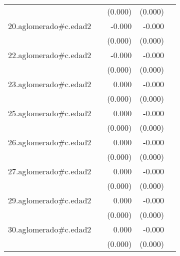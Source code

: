 {\begin{longtable}{l*{4}{D{.}{.}{-1}}}
            &                     &     (0.000)         &     (0.000)         &                     \\
\addlinespace
20.aglomerado#c.edad2&                     &      -0.000         &      -0.000\sym{**} &                     \\
            &                     &     (0.000)         &     (0.000)         &                     \\
\addlinespace
22.aglomerado#c.edad2&                     &      -0.000         &      -0.000\sym{*}  &                     \\
            &                     &     (0.000)         &     (0.000)         &                     \\
\addlinespace
23.aglomerado#c.edad2&                     &       0.000         &      -0.000         &                     \\
            &                     &     (0.000)         &     (0.000)         &                     \\
\addlinespace
25.aglomerado#c.edad2&                     &       0.000         &      -0.000         &                     \\
            &                     &     (0.000)         &     (0.000)         &                     \\
\addlinespace
26.aglomerado#c.edad2&                     &       0.000         &      -0.000         &                     \\
            &                     &     (0.000)         &     (0.000)         &                     \\
\addlinespace
27.aglomerado#c.edad2&                     &       0.000         &      -0.000         &                     \\
            &                     &     (0.000)         &     (0.000)         &                     \\
\addlinespace
29.aglomerado#c.edad2&                     &       0.000         &      -0.000         &                     \\
            &                     &     (0.000)         &     (0.000)         &                     \\
\addlinespace
30.aglomerado#c.edad2&                     &       0.000         &      -0.000         &                     \\
            &                     &     (0.000)         &     (0.000)         &                     \\

\end{longtable}}
